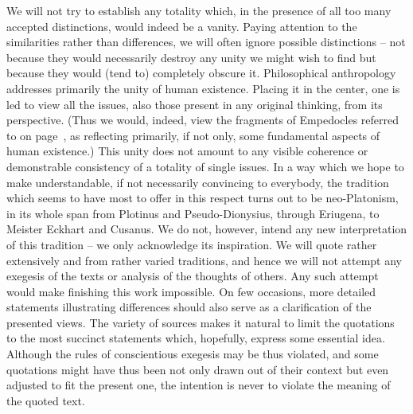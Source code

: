 We will not try to establish any totality which, in the presence of all too many
accepted distinctions, would indeed be a vanity. Paying attention to the
similarities rather than differences, we will often ignore possible distinctions
-- not because they would necessarily destroy any unity we might wish to find
but because they would (tend to) completely obscure it. Philosophical anthropology addresses primarily the
unity of human existence. Placing it in the center, one is led to view all the
issues, also those present in any original thinking, from its perspective. (Thus
we would, indeed, view the fragments of Empedocles referred to on
page~\pageref{Emp}, as reflecting primarily, if not only, some fundamental
aspects of human existence.) This unity does not amount to any visible coherence
or demonstrable consistency of a totality of single issues. In a way which we
hope to make understandable, if not necessarily convincing to everybody, the
tradition which seems to have most to offer in this respect turns out to be
neo-Platonism, in its whole span from Plotinus and Pseudo-Dionysius, through
Eriugena, to Meister Eckhart and Cusanus. We do not, however, intend any new
interpretation of this tradition -- we only acknowledge its inspiration. We will
quote rather extensively and from rather varied traditions, and hence we will
not attempt any exegesis of the texts or analysis of the thoughts of others.
Any such attempt would make finishing this work impossible.  On few occasions,
more detailed statements illustrating differences should also serve as a
clarification of the presented views.  The variety of sources makes it natural
to limit the quotations to the most succinct statements which, hopefully,
express some essential idea.  Although the rules of conscientious exegesis may
be thus violated, and some quotations might have thus been not only drawn out of
their context but even adjusted to fit the present one, the intention is never
to violate the meaning of the quoted text.

